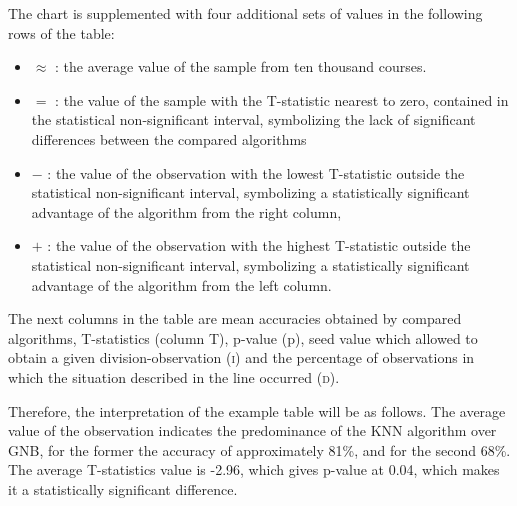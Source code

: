 \documentclass[12pt,a4paper]{report}
\begin{document}
The chart is supplemented with four additional sets of values in the following rows of the table:


\begin{itemize}
	\item $\approx$ : the average value of the sample from ten thousand courses.
	\item $=$ : the value of the sample with the T-statistic nearest to zero, contained in the statistical non-significant interval, symbolizing the lack of significant differences between the compared algorithms
	\item $-$ : the value of the observation with the lowest T-statistic outside the statistical non-significant interval, symbolizing a statistically significant advantage of the algorithm from the right column,
	\item $+$ : the value of the observation with the highest T-statistic outside the statistical non-significant interval, symbolizing a statistically significant advantage of the algorithm from the left column.
\end{itemize}

The next columns in the table are mean accuracies obtained by compared algorithms, T-statistics (column T), p-value (p), seed value which allowed to obtain a given division-observation (\textsc{i}) and the percentage of observations in which the situation described in the line occurred (\textsc{d}).


Therefore, the interpretation of the example table will be as follows. The average value of the observation indicates the predominance of the KNN algorithm over GNB, for the former the accuracy of approximately 81\%, and for the second 68\%. The average T-statistics value is -2.96, which gives p-value at 0.04, which makes it a statistically significant difference.

\end{document}
